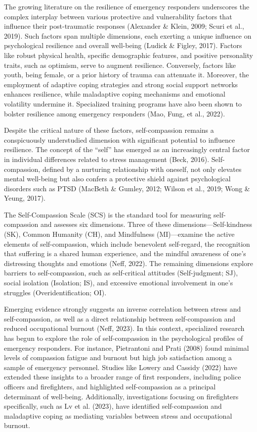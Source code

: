 \documentclass[
  man]{apa7}
\begin{document}
The growing literature on the resilience of emergency responders underscores the complex interplay between various protective and vulnerability factors that influence their post-traumatic responses (Alexander \& Klein, 2009; Scuri et al., 2019). Such factors span multiple dimensions, each exerting a unique influence on psychological resilience and overall well-being (Ludick \& Figley, 2017). Factors like robust physical health, specific demographic features, and positive personality traits, such as optimism, serve to augment resilience. Conversely, factors like youth, being female, or a prior history of trauma can attenuate it. Moreover, the employment of adaptive coping strategies and strong social support networks enhances resilience, while maladaptive coping mechanisms and emotional volatility undermine it. Specialized training programs have also been shown to bolster resilience among emergency responders (Mao, Fung, et al., 2022).

Despite the critical nature of these factors, self-compassion remains a conspicuously understudied dimension with significant potential to influence resilience. The concept of the ``self'' has emerged as an increasingly central factor in individual differences related to stress management (Beck, 2016). Self-compassion, defined by a nurturing relationship with oneself, not only elevates mental well-being but also confers a protective shield against psychological disorders such as PTSD (MacBeth \& Gumley, 2012; Wilson et al., 2019; Wong \& Yeung, 2017).

The Self-Compassion Scale (SCS) is the standard tool for measuring self-compassion and assesses six dimensions. Three of these dimensions---Self-kindness (SK), Common Humanity (CH), and Mindfulness (MI)---examine the active elements of self-compassion, which include benevolent self-regard, the recognition that suffering is a shared human experience, and the mindful awareness of one's distressing thoughts and emotions (Neff, 2022). The remaining dimensions explore barriers to self-compassion, such as self-critical attitudes (Self-judgment; SJ), social isolation (Isolation; IS), and excessive emotional involvement in one's struggles (Overidentification; OI).

Emerging evidence strongly suggests an inverse correlation between stress and self-compassion, as well as a direct relationship between self-compassion and reduced occupational burnout (Neff, 2023). In this context, specialized research has begun to explore the role of self-compassion in the psychological profiles of emergency responders. For instance, Pietrantoni and Prati (2008) found minimal levels of compassion fatigue and burnout but high job satisfaction among a sample of emergency personnel. Studies like Lowery and Cassidy (2022) have extended these insights to a broader range of first responders, including police officers and firefighters, and highlighted self-compassion as a principal determinant of well-being. Additionally, investigations focusing on firefighters specifically, such as Lv et al. (2023), have identified self-compassion and maladaptive coping as mediating variables between stress and occupational burnout.
\end{document}
